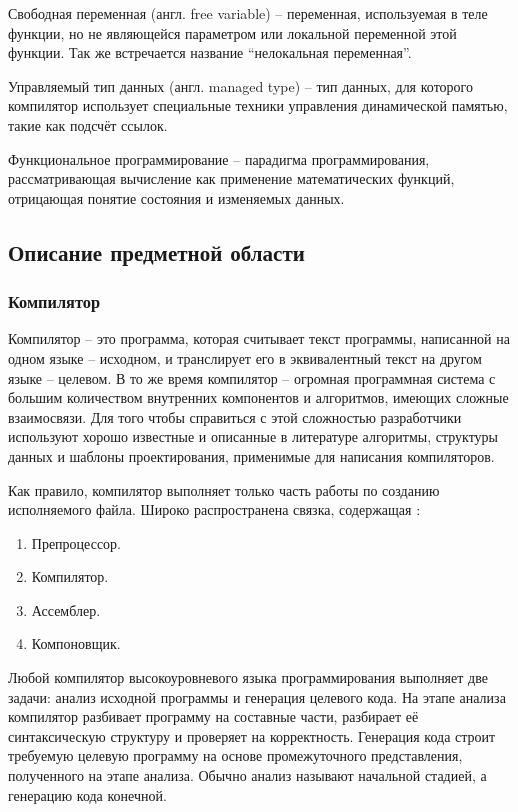 \documentclass{imcs}
\begin{document}
Свободная переменная (англ. free variable) -- переменная, используемая в теле функции, но не
являющейся параметром или локальной переменной этой функции. Так же встречается название
``нелокальная переменная''.

Управляемый тип данных (англ. managed type) -- тип данных, для которого компилятор
использует специальные техники управления динамической памятью,
такие как подсчёт ссылок\cite{delhpimanged}.

Функциональное программирование -- парадигма программирования,
рассматривающая вычисление как применение математических функций,
отрицающая понятие состояния и изменяемых данных.


\subsection{Описание предметной области}

\subsubsection{Компилятор}

Компилятор -- это программа, которая считывает текст программы, написанной на одном языке
-- исходном, и транслирует его в эквивалентный текст на другом языке -- целевом.
В то же время компилятор -- огромная программная система с большим количеством внутренних
компонентов и алгоритмов, имеющих сложные взаимосвязи. Для того чтобы справиться с этой
сложностью разработчики используют хорошо известные и описанные в литературе
алгоритмы, структуры данных и шаблоны проектирования, применимые для написания компиляторов.

Как правило, компилятор выполняет только часть работы по созданию исполняемого файла.
Широко распространена связка, содержащая \cite{dragonbook}:
\begin{enumerate}
    \item Препроцессор.
    \item Компилятор.
    \item Ассемблер.
    \item Компоновщик.
\end{enumerate}

Любой компилятор высокоуровневого языка программирования выполняет две задачи: анализ исходной программы
и генерация целевого кода. На этапе анализа компилятор разбивает программу на составные части, разбирает
её синтаксическую структуру и проверяет на корректность. Генерация кода строит требуемую целевую
программу на основе промежуточного представления, полученного на этапе анализа. Обычно анализ называют
начальной стадией, а генерацию кода конечной.
\end{document}
